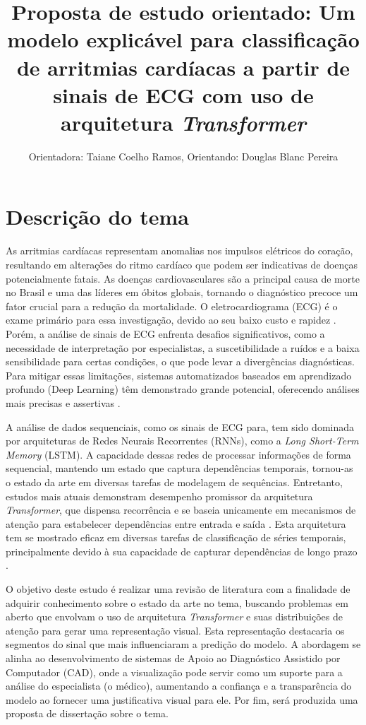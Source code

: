 \documentclass[12pt]{article}
\title{Proposta de estudo orientado: Um modelo explicável para classificação de arritmias cardíacas a partir de sinais de ECG com uso de arquitetura \textit{Transformer}}
\author{Orientadora: Taiane Coelho Ramos\inst{1}, Orientando: Douglas Blanc Pereira\inst{1}}
\begin{document}
 

\maketitle

\section{Descrição do tema}

As arritmias cardíacas representam anomalias nos impulsos elétricos do coração, resultando em alterações do ritmo cardíaco que podem ser indicativas de doenças potencialmente fatais. As doenças cardiovasculares são a principal causa de morte no Brasil e uma das líderes em óbitos globais, tornando o diagnóstico precoce um fator crucial para a redução da mortalidade. O eletrocardiograma (ECG) é o exame primário para essa investigação, devido ao seu baixo custo e rapidez \cite{zirpolo2025modelo,da2024arritmias}. Porém, a análise de sinais de ECG enfrenta desafios significativos, como a necessidade de interpretação por especialistas, a suscetibilidade a ruídos e a baixa sensibilidade para certas condições, o que pode levar a divergências diagnósticas. Para mitigar essas limitações, sistemas automatizados baseados em aprendizado profundo (Deep Learning) têm demonstrado grande potencial, oferecendo análises mais precisas e assertivas \cite{ansari2023deep}.

A análise de dados sequenciais, como os sinais de ECG para, tem sido dominada por arquiteturas de Redes Neurais Recorrentes (RNNs), como a \textit{Long Short-Term Memory} (LSTM). A capacidade dessas redes de processar informações de forma sequencial, mantendo um estado que captura dependências temporais, tornou-as o estado da arte em diversas tarefas de modelagem de sequências. Entretanto, estudos mais atuais demonstram desempenho promissor da arquitetura \textit{Transformer}, que dispensa recorrência e se baseia unicamente em mecanismos de atenção para estabelecer dependências entre entrada e saída \cite{vaswani2017attention}. Esta arquitetura tem se mostrado eficaz em diversas tarefas de classificação de séries temporais, principalmente devido à sua capacidade de capturar dependências de longo prazo \cite{wen2022transformers}.

O objetivo deste estudo é realizar uma revisão de literatura com a finalidade de adquirir conhecimento sobre o estado da arte no tema, buscando problemas em aberto que envolvam o uso de arquitetura \textit{Transformer} e suas distribuições de atenção para gerar uma representação visual. Esta representação destacaria os segmentos do sinal que mais influenciaram a predição do modelo. A abordagem se alinha ao desenvolvimento de sistemas de Apoio ao Diagnóstico Assistido por Computador (CAD), onde a visualização pode servir como um suporte para a análise do especialista (o médico), aumentando a confiança e a transparência do modelo ao fornecer uma justificativa visual para ele. Por fim, será produzida uma proposta de dissertação sobre o tema.
\end{document}
